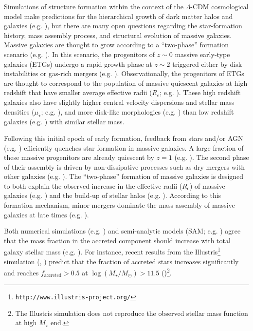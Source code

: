 \documentclass[a4paper,fleqn,usenatbib]{mnras}
\def\mstar{{$M_{\star}$}}
\def\logms{{$\log (M_{\star}/M_{\odot})$}}
\def\mden{{$\mu_{\star}$}}
\begin{document}
    Simulations of structure formation within the context of the $\Lambda$-CDM 
    cosmological model make predictions for the hierarchical growth of dark matter 
    halos and galaxies (e.g. \citealt{Baugh1996, DeLucia2006}), but there are many 
    open questions regarding the star-formation history, mass assembly process, and 
    structural evolution of massive galaxies. 
    Massive galaxies are thought to grow according to a ``two-phase'' formation 
    scenario (e.g. \citealt{Oser2010, Oser2012}). 
    In this scenario, the progenitors of $z{\sim} 0$ massive early-type galaxies 
    (ETGs) undergo a rapid growth phase at $z{\sim} 2$ triggered either by disk 
    instabilities or gas-rich mergers (e.g. \citealt{Hopkins2008, Dekel2009}). 
    Observationally, the progenitors of ETGs are thought to correspond to the 
    population of massive quiescent galaxies at high redshift that have smaller 
    average effective radii ($R_{\mathrm{e}}$; e.g. \citealt{Trujillo2006, 
    vanDokkum2008, Cimatti2008}).  
    These high redshift galaxies also have slightly higher central velocity dispersions 
    and stellar mass densities (\mden{}; e.g. \citealt{vandeSande2011, Belli2014}), 
    and more disk-like morphologies (e.g. \citealt{vanderWel2011}) than low redshift 
    galaxies (e.g. \citealt{Bezanson2009, vanDokkum2010}) with similar stellar mass.
    
    Following this initial epoch of early formation, feedback from stars and/or AGN 
    (e.g. \citealt{Sijacki2007, Fabian2012}) efficiently quenches star formation in 
    massive galaxies. 
    A large fraction of these massive progenitors are already quiescent by $z=1$ 
    (e.g. \citealt{Bezanson2009, Kriek2016}). 
    The second phase of their assembly is driven by non-dissipative processes such 
    as dry mergers with other galaxies (e.g. \citealt{Naab2006, Khochfar2006}). 
    The ``two-phase'' formation of massive galaxies is designed to both explain the 
    observed increase in the effective radii ($R_{\mathrm{e}}$) of massive galaxies 
    (e.g. \citealt{Newman2012, vdWel2014}) and the build-up of stellar 
    halos  (e.g. \citealt{Szomoru2012, Patel2013}). 
    According to this formation mechanism, minor mergers dominate the mass assembly 
    of massive galaxies at late times 
    (e.g. \citealt{Hilz2012, Hilz2013, Oogi2013, Bedorf2013, Laporte2013}).
    
    Both numerical simulations (e.g. \citealt{Oser2010}) and 
    semi-analytic models (SAM; e.g. \citealt{LeeYi2013, LeeYi2017}) agree that the 
    mass fraction in the accreted component should increase with total galaxy stellar 
    mass (e.g. \citealt{Lackner2012, Cooper2013, Qu2017}).
    For instance, recent results from the 
    Illustris\footnote{\texttt{http://www.illustris-project.org/}} simulation 
    (\citealt{Vogelsberger2014}, \citealt{Genel2014}) predict that the fraction of  
    accreted stars increases significantly and reaches $f_{\mathrm{accreted}}>0.5$ at 
    \logms{}$>11.5$ (\citealt{RodriguezGomez2016})\footnote{The Illustris simulation
    does not reproduce the observed stellar mass function at high \mstar{} end.}. 
    
\end{document}
